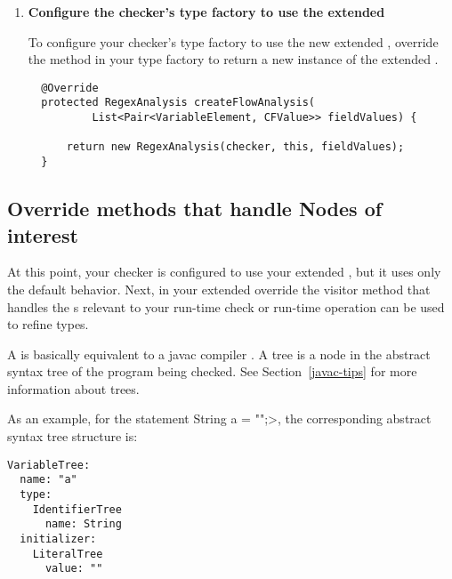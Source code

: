 \begin{enumerate}
\item \textbf{Configure the checker's type factory to use the extended
    }

\begin{sloppypar}
To configure your checker's type factory to use the new extended
, override the
 method in your type factory to return a new instance
of the extended .
\end{sloppypar}

\begin{smaller}
\begin{Verbatim}
  @Override
  protected RegexAnalysis createFlowAnalysis(
          List<Pair<VariableElement, CFValue>> fieldValues) {

      return new RegexAnalysis(checker, this, fieldValues);
  }
\end{Verbatim}
\end{smaller}

\end{enumerate}

\subsection{Override methods that handle Nodes of
interest\label{dataflow-override-methods}}

At this point, your checker is configured to use your extended
, but it uses only the default
behavior. Next, in your extended 
override the visitor method that handles the s
relevant to your run-time check or run-time operation can be used to refine
types.

A  is basically equivalent to a javac compiler
.  A tree is a node in the abstract syntax tree of the
program being checked. See Section~\ref{javac-tips} for more information about trees.

As an example, for the statement \<String a = "";>, the corresponding
abstract syntax tree structure is:
\begin{Verbatim}
VariableTree:
  name: "a"
  type: 
    IdentifierTree
      name: String
  initializer:
    LiteralTree
      value: ""
\end{Verbatim}

